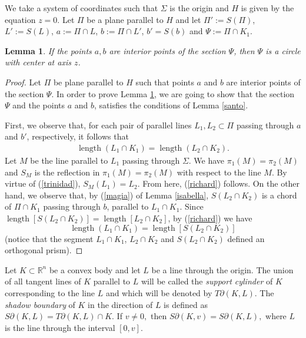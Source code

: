 \documentclass[12pt]{article}
\newcommand{\len}{\operatorname*{length}}
\newcommand{\Rn}{\mathbb{R}^{n}}
\newtheorem{lemma}{Lemma}
\begin{document}
We take a system of coordinates such that $\Sigma$ is the origin and $H$ is given by the equation $z=0$. Let $\Pi$ be a plane parallel to $H$ and let $\Pi':=S(\Pi)$, $L':=S(L)$, $a:= \Pi \cap L$, $b:= \Pi \cap L'$, $b'=S(b)$ and $\Psi:= \Pi \cap K_1$. 
 
\begin{lemma}\label{revolution}
If the points $a,b $ are interior points of the section $\Psi$, then  
$\Psi$ is a circle with center at axis $z$. 
\end{lemma}
\begin{proof}
Let $\Pi$ be plane parallel to $H$ such that  points $a$ and $b$ are interior points of the section $\Psi $. In order to prove Lemma \ref{revolution}, we are going to show that the section $\Psi$ and the points $a$ and $b$, satisfies the conditions of Lemma \ref{santo}.

First, we observe that, for each pair of parallel lines $L_1,L_2\subset  \Pi$ passing through $a$ and $b'$, respectively, it follows that 
\begin{eqnarray}\label{richard}
\len(L_1\cap K_1)=\len(L_2\cap K_2).
\end{eqnarray} 
Let $M$ be the line parallel to $L_1$ passing through $\Sigma$. We have $\pi_1 (M)= \pi_2 (M)$ and $S_M$ is the reflection in $\pi_1 (M)=\pi_2(M)$ with respect to the line $M$. By virtue of (\ref{trinidad}), $S_M(L_1)=L_2$. From here, (\ref{richard}) follows. On the other hand, we observe that, by (\ref{magia}) of Lemma \ref{isabella}, $S(L_2\cap K_2)$ is a chord of $\Pi \cap K_1$ passing through $b$, parallel to $L_1\cap K_1$. Since $\len[ S(L_2\cap K_2)]=\len[L_2\cap K_2]$, by (\ref{richard}) we have 
\[
\len(L_1\cap K_1)=\len[ S(L_2\cap K_2)] 
\]
(notice that the segment $L_1 \cap K_1$, $L_2 \cap K_2$ and $S(L_2\cap K_2)$ defined an orthogonal prism).
\end{proof}


Let $K\subset \Rn$ be a convex body and let $L$ be a line through the origin. The union of all tangent lines of $K$ parallel to $L$ will be called 
the \textit{support cylinder} of $K$ corresponding to the line $L$ and which will be denoted by $T\partial (K,L)$. The \textit{shadow boundary} of $K$ in the direction of $L$ is defined as $S\partial (K,L)=T\partial (K,L)\cap K.$ If $v\neq 0,$ then $S\partial(K,v)=S\partial (K,L),$ where $L$ is the line through the interval $[0,v]$.
\end{document}

